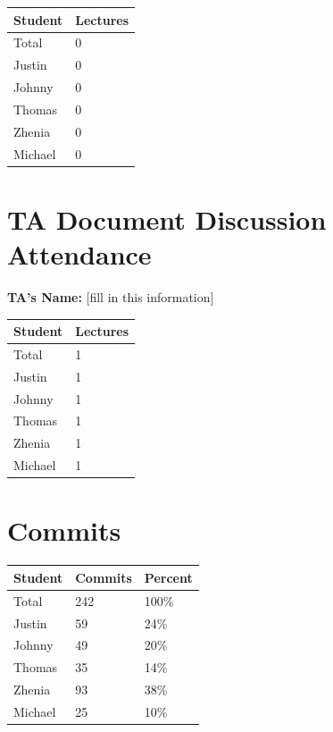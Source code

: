 \documentclass{article}
\begin{document}
\begin{table}[H]
\centering
\begin{tabular}{ll}
\toprule
\textbf{Student} & \textbf{Lectures}\\
\midrule
Total & 0\\
Justin & 0\\
Johnny & 0\\
Thomas & 0\\
Zhenia & 0\\
Michael & 0\\
\bottomrule
\end{tabular}
\end{table}

\section{TA Document Discussion Attendance}

\noindent \textbf{TA's Name: } [fill in this information]

\begin{table}[H]
\centering
\begin{tabular}{ll}
\toprule
\textbf{Student} & \textbf{Lectures}\\
\midrule
Total & 1\\
Justin & 1\\
Johnny & 1\\
Thomas & 1\\
Zhenia & 1\\
Michael & 1\\
\bottomrule
\end{tabular}
\end{table}

\section{Commits}

\begin{table}[H]
\centering
\begin{tabular}{lll}
\toprule
\textbf{Student} & \textbf{Commits} & \textbf{Percent}\\
\midrule
Total & 242 & 100\% \\
Justin & 59& 24\% \\
Johnny & 49& 20\% \\
Thomas & 35 & 14\% \\
Zhenia & 93 & 38\% \\
Michael & 25 & 10\% \\
\bottomrule
\end{tabular}
\end{table}
\end{document}
